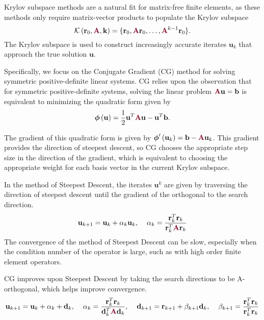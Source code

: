Krylov subspace methods are a natural fit for matrix-free finite elements, as these methods only require matrix-vector products to populate the Krylov subspace
\begin{equation}
\mathcal{K} \left( \mathbf{r}_0, {\color{burgundy}\mathbf{A}}, \mathbf{k} \right) = \lbrace \mathbf{r}_0, {\color{burgundy}\mathbf{A}} \mathbf{r}_0, \dots, {\color{burgundy}\mathbf{A}}^{k - 1} \mathbf{r}_0 \rbrace.
\label{krylov_space}
\end{equation}
The Krylov subspace is used to construct increasingly accurate iterates $\mathbf{u}_k$ that approach the true solution $\mathbf{u}$.

Specifically, we focus on the Conjugate Gradient (CG) method \cite{hestenes1952methods, shewchuk1994introduction} for solving symmetric positive-definite linear systems.
CG relies upon the observation that for symmetric positive-definite systems, solving the linear problem ${\color{burgundy}\mathbf{A}} \mathbf{u} = \mathbf{b}$ is equivalent to minimizing the quadratic form given by
\begin{equation}
\boldsymbol{\phi} \left( \mathbf{u} \right) = \frac{1}{2} \mathbf{u}^T {\color{burgundy}\mathbf{A}} \mathbf{u} - \mathbf{u}^T \mathbf{b}.
\end{equation}

The gradient of this quadratic form is given by $\boldsymbol{\phi}' \left( \mathbf{u}_k \right) = \mathbf{b} - {\color{burgundy}\mathbf{A}} \mathbf{u}_k$.
This gradient provides the direction of steepest descent, so CG chooses the appropriate step size in the direction of the gradient, which is equivalent to choosing the appropriate weight for each basis vector in the current Krylov subspace.

In the method of Steepest Descent, the iterates $\mathbf{u}^k$ are given by traversing the direction of steepest descent until the gradient of the orthogonal to the search direction.
\begin{equation}
\mathbf{u}_{k + 1} = \mathbf{u}_k + \alpha_k \mathbf{u}_k, \hspace{4mm}
\alpha_k = \frac{\mathbf{r}_k^T \mathbf{r}_k}{\mathbf{r}_k^T {\color{burgundy}\mathbf{A}} \mathbf{r}_k}
\end{equation}
The convergence of the method of Steepest Descent can be slow, especially when the condition number of the operator is large, such as with high order finite element operators.

CG improves upon Steepest Descent by taking the search directions to be A-orthogonal, which helps improve convergence.
\begin{equation}
\mathbf{u}_{k + 1} = \mathbf{u}_k + \alpha_k + \mathbf{d}_k, \hspace{4mm}
\alpha_k  = \frac{\mathbf{r}_k^T \mathbf{r}_k}{\mathbf{d}_k^T {\color{burgundy}\mathbf{A}} \mathbf{d}_k}, \hspace{4mm}
\mathbf{d}_{k + 1} = \mathbf{r}_{k + 1} + \beta_{k + 1} \mathbf{d}_k, \hspace{4mm}
\beta_{k + 1} = \frac{\mathbf{r}_k^T \mathbf{r}_k}{\mathbf{r}_k^T \mathbf{r}_k}
\end{equation}

